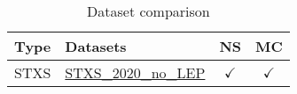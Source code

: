 \documentclass{article}
\begin{document}
\begin{table}[H]
\footnotesize
\centering
\begin{tabular}{|c|l|c|c|}
\hline
 Type & Datasets  & NS & MC \\ \hline
\multirow{1}{*}{STXS}
 & \href{https://arxiv.org/abs/1302.3415}{STXS_2020_no_LEP}  & $\checkmark$ & $\checkmark$
\\ \hline
\end{tabular}
\caption{Dataset comparison}
\end{table}
\end{document}
